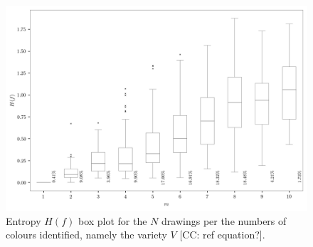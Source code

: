 \documentclass[11pt,a4paper]{article}
\begin{document}
\begin{figure}[h!]
	\centering
	\includegraphics[width=\linewidth]{figures/colors-boxplot.png}
	\caption{Entropy $H(f)$ box plot for the $N$ drawings per the numbers of colours identified, namely the variety $V$ {\color{red}[CC: ref equation?]}.}
	\label{fig:boxplotvariety}
\end{figure}
\end{document}
